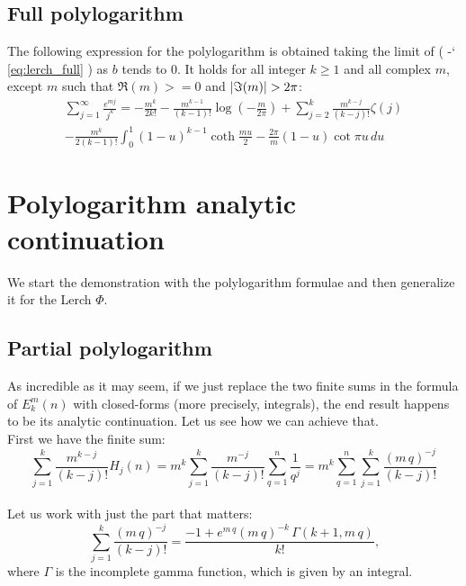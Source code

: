 \documentclass[12pt]{article}
\DeclarePairedDelimiter\abs{\lvert}{\rvert}%
\newcommand*{\eqrefe}[1]{%
\begingroup
(\color{BrickRed}
\romannumeral-`\x %
\setcitestyle{numbers}%
\ref{eq:#1}%
\endgroup
)\ignorespacesafterend
}
\begin{document}
\subsection{Full polylogarithm} \label{full_poly}
The following expression for the polylogarithm is obtained taking the limit of \eqrefe{lerch_full} as $b$ tends to 0. It holds for all integer $k\ge 1$ and all complex $m$, except $m$ such that $\Re{(m)}>=0$ and $\abs{\Im{(m)}}>2\pi$:
\begin{multline} \nonumber
\sum _{j=1}^{\infty} \frac{e^{m j}}{j^{k}}=-\frac{m^{k}}{2k!}-\frac{m^{k-1}}{(k-1)!}\log{\left(-\frac{m}{2\pi}\right)}+\sum_{j=2}^{k}\frac{m^{k-j}}{(k-j)!}\zeta(j)\\
-\frac{m^{k}}{2(k-1)!}\int_{0}^{1}(1-u)^{k-1}\coth{\frac{m u}{2}}-\frac{2\pi}{m}(1-u)\cot{\pi u}\,du
\end{multline}

\section{Polylogarithm analytic continuation} \label{polylog}
We start the demonstration with the polylogarithm formulae and then generalize it for the Lerch $\Phi$.

\subsection{Partial polylogarithm} \label{AC_part}
As incredible as it may seem, if we just replace the two finite sums in the formula of $E^m_k(n)$ with closed-forms (more precisely, integrals), the end result happens to be its analytic continuation. Let us see how we can achieve that.\\

First we have the finite sum:
\begin{equation} \nonumber
\sum_{j=1}^{k}\frac{m^{k-j}}{(k-j)!}H_{j}(n)=m^k\sum_{j=1}^{k}\frac{m^{-j}}{(k-j)!}\sum_{q=1}^{n}\frac{1}{q^j}=m^k\sum_{q=1}^{n}\sum_{j=1}^{k}\frac{(m\,q)^{-j}}{(k-j)!}
\end{equation}\\
\indent Let us work with just the part that matters:
\begin{equation} \nonumber
\sum_{j=1}^{k}\frac{(m\,q)^{-j}}{(k-j)!}=\frac{-1+e^{m\,q}(m\,q)^{-k}\,\Gamma{(k+1,m\,q)}}{k!} \text{,}
\end{equation}
\noindent where $\Gamma$ is the incomplete gamma function, which is given by an integral.\\
\end{document}
